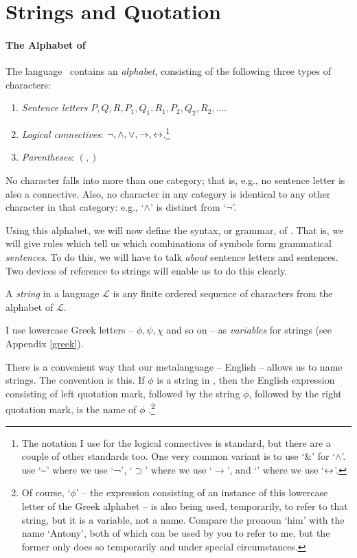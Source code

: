 
\section{Strings and Quotation}

\paragraph{The Alphabet of \lone}
The language \lone\ contains an \emph{alphabet}, consisting of the following three types of characters: \begin{enumerate}
	\item \emph{Sentence letters} $P,Q,R,P_{1},Q_{1},R_{1},P_{2},Q_{2},R_{2},\ldots$.
	\item  \emph{Logical connectives}: $\neg, \wedge, \vee, \to, \leftrightarrow$.\footnote{The notation I use for the logical connectives is standard, but there are a couple of other standards too. One very common variant is to use `\&' for `$\wedge$'. \citet[25]{bevpospa} use `\sim' where we use `¬', `$\supset$' where we use `$\to$', and `\equiv' where we use `$\leftrightarrow$'.}
	\item \emph{Parentheses}: $(,)$
\end{enumerate}
No character falls into more than one category; that is, e.g., no sentence letter is also a connective. Also, no character in any category is identical to any other character in that category: e.g., `$\wedge$' is distinct from `$\neg$'.

Using this alphabet, we will now define the syntax, or grammar, of \lone. That is, we will give rules which tell us which combinations of symbols form grammatical \emph{sentences}. To do this, we will have to talk \emph{about} sentence letters and sentences. Two devices of reference to strings will enable us to do this clearly.

\begin{definition}[String]
	A \emph{string} in a language $\mathcal{L}$ is any finite ordered sequence of characters from the alphabet of $\mathcal{L}$.
\end{definition}
 I use lowercase Greek letters – $\phi, \psi, \chi$ and so on – as \emph{variables} for strings (see Appendix \ref{greek}). 

 There is a convenient way that our metalanguage – English – allows us to name strings. The convention is this. If $\phi$ is a string in \lone, then the English expression consisting of left quotation mark, followed by the string $\phi$, followed by the right quotation mark, is the name of $\phi$ \citep[397]{richard}.\footnote{Of course, ‘$\phi$’ – the expression consisting of an instance of this lowercase letter of the Greek alphabet – is also being used, temporarily, to refer to that string, but it is a variable, not a name. Compare the pronoun `him' with the name ‘Antony’, both of which can be used by you to refer to me, but the former only does so temporarily and under special circumstances.} 

